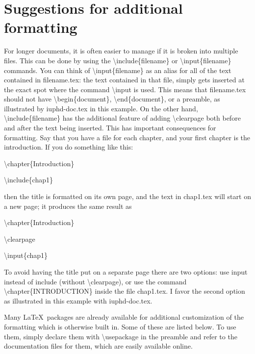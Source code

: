 \section{Suggestions for additional formatting}

For longer documents, it is often easier to manage if it is broken into multiple files.  This can be done by using the
\textbackslash include\{filename\} or \textbackslash input\{filename\} commands.  You can think of
\textbackslash input\{filename\} as an alias for all of the text contained in filename.tex: the text contained in that file,
simply gets inserted at the exact spot where the command \textbackslash input is used.  This means that filename.tex should not have
\textbackslash begin\{document\}, \textbackslash end\{document\}, or a preamble, as illustrated by iuphd-doc.tex in this example.
On the other hand, \textbackslash include\{filename\} has the additional feature of adding \textbackslash clearpage both before and after
the text being inserted.  This has important consequences for formatting.  Say that you have a file for each chapter,
and your first chapter is the introduction.  If you do something like this:
\medskip

\textbackslash chapter\{Introduction\}

\textbackslash include\{chap1\}
\medskip

\noindent then the title is formatted on its own page, and the text in chap1.tex will start on a new page; it produces
the same result as
\medskip

\textbackslash chapter\{Introduction\}

\textbackslash clearpage

\textbackslash input\{chap1\}
\medskip

\noindent To avoid having the title put on a separate page there are two options: use input instead of include
(without \textbackslash clearpage), or use the command \textbackslash chapter\{INTRODUCTION\} inside the file chap1.tex.
I favor the second option as illustrated in this example with iuphd-doc.tex.

Many \LaTeX \ packages are already available for additional customization of the formatting which is otherwise built in.
Some of these are listed below.  To use them, simply declare them with \textbackslash usepackage in the preamble
and refer to the documentation files for them, which are easily available online.

